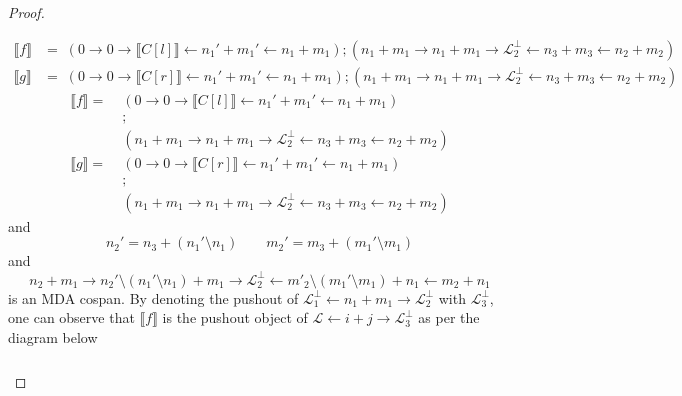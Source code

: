 \begin{proof}
\begin{itemize}
            \begin{align*}
                \llbracket f \rrbracket &= \;
                (0 \to 0 \to \llbracket C[l] \rrbracket \xleftarrow{} n_1' + m_1' \xleftarrow{} n_1 + m_1)
                ;
                (n_1 + m_1 \xrightarrow{} n_1 + m_1 \xrightarrow{} \mathcal{L}_2^{\bot} \xleftarrow{} n_3 + m_3 \xleftarrow{} n_2 + m_2)\\
                \llbracket g \rrbracket &= \;
                (0 \to 0 \to \llbracket C[r] \rrbracket \xleftarrow{} n_1' + m_1' \xleftarrow{} n_1 + m_1)
                ;
                (n_1 + m_1 \xrightarrow{} n_1 + m_1 \xrightarrow{} \mathcal{L}_2^{\bot} \xleftarrow{} n_3 + m_3 \xleftarrow{} n_2 + m_2)
                \end{align*}
            \else
            \begin{align*}
            \llbracket f \rrbracket = \;
            &(0 \to 0 \to \llbracket C[l] \rrbracket \xleftarrow{} n_1' + m_1' \xleftarrow{} n_1 + m_1)\\
            &;\\
            &(n_1 + m_1 \xrightarrow{} n_1 + m_1 \xrightarrow{} \mathcal{L}_2^{\bot} \xleftarrow{} n_3 + m_3 \xleftarrow{} n_2 + m_2)\\
            \llbracket g \rrbracket = \;
            &(0 \to 0 \to \llbracket C[r] \rrbracket \xleftarrow{} n_1' + m_1' \xleftarrow{} n_1 + m_1)\\
            &;\\
            &(n_1 + m_1 \xrightarrow{} n_1 + m_1 \xrightarrow{} \mathcal{L}_2^{\bot} \xleftarrow{} n_3 + m_3 \xleftarrow{} n_2 + m_2)
            \end{align*}
            \fi
            and
            \[
                n_2' = n_3 + (n_1' \setminus n_1) \qquad m_2' = m_3 + (m_1' \setminus m_1)
            \]
            and
            \[
            n_2 + m_1 \xrightarrow{} n_2' \setminus (n_1' \setminus n_1) + m_1 \xrightarrow{} \mathcal{L}_{2}^{\bot} \xleftarrow{} m'_2 \setminus (m_1' \setminus m_1) + n_1 \xleftarrow{} m_2 + n_1    
            \] is an MDA cospan.
            By denoting the pushout of $\mathcal{L}_1^{\bot} \xleftarrow{} n_1 + m_1 \xrightarrow{} \mathcal{L}_{2}^{\bot}$ with $\mathcal{L}_3^{\bot}$,
            one can observe that $\llbracket f \rrbracket$ is the pushout object of $\mathcal{L} \xleftarrow{} i+j \xrightarrow{} \mathcal{L}_{3}^{\bot}$ as per the diagram below
            \[\begin{tikzcd}

\end{tikzcd}\]
\end{itemize}
\end{proof}
